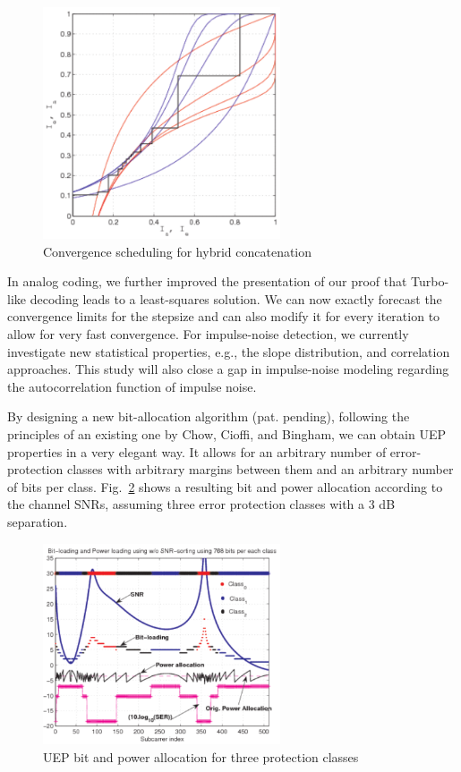 \begin{figure}[ht]
  \centering
  \includegraphics[width=7cm]{henkel_1}
 \caption{Convergence scheduling for hybrid concatenation}
  \label{fig:henkel_1}
\end{figure}

In analog coding, we further improved the presentation of our proof that
Turbo-like decoding leads to a least-squares solution. We can now exactly
forecast the convergence limits for the stepsize and can also
modify it for every iteration to allow for very fast
convergence. For impulse-noise detection, we currently investigate new
statistical properties, e.g., the slope distribution, and correlation
approaches. This study will also close a gap in impulse-noise modeling
regarding the autocorrelation function of impulse noise.

By designing a new bit-allocation algorithm (pat. pending),
following the principles of an existing one by Chow, Cioffi, and
Bingham, we can obtain UEP properties in a very elegant way. It
allows for an arbitrary number of error-protection classes with
arbitrary margins between them and an arbitrary number of bits per
class. Fig.~\ref{fig:henkel_2} shows a resulting bit and power
allocation according to the channel SNRs, assuming three error
protection classes with a 3 dB separation.


\begin{figure}[ht]
  \centering
  \includegraphics[width=7cm]{henkel_2}
  \caption{UEP bit and power allocation for three protection classes}
  \label{fig:henkel_2}
\end{figure}

